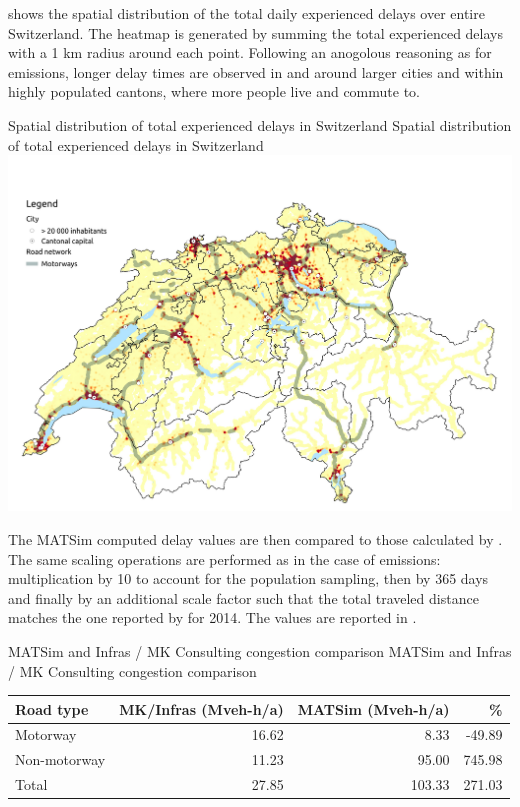  shows the spatial distribution of the total daily experienced delays over entire Switzerland.
The heatmap is generated by summing the total experienced delays with a 1 km radius around each point.
Following an anogolous reasoning as for emissions, longer delay times are observed in and around larger cities and within highly populated cantons, where more people live and commute to.

\createfigure%
{Spatial distribution of total experienced delays in Switzerland}%
{Spatial distribution of total experienced delays in Switzerland}%
{\label{fig:spatialDelays}}%
{\includegraphics[width=1.0\textwidth, angle=0]{figures/total_delays_heatmap.pdf}}%
{}

The MATSim computed delay values are then compared to those calculated by \citet{mkinfras2016staukosten}.
The same scaling operations are performed as in the case of emissions: multiplication by 10 to account for the population sampling, then by 365 days and finally by an additional scale factor such that the total traveled distance matches the one reported by \citet{mkinfras2016staukosten} for 2014.
The values are reported in .


\createtable%
{MATSim and Infras / MK Consulting congestion comparison}%
{MATSim and Infras / MK Consulting congestion comparison}%
{\label{tab:delayValueComparison}}%
{%
  \begin{tabular}[c]{lrrr}
    \toprule
    Road type & MK/Infras (Mveh-h/a) & MATSim (Mveh-h/a) & \%  \\ 
    \midrule
    Motorway      & 16.62 &    8.33 &  -49.89 \\
    Non-motorway  & 11.23 &   95.00 &  745.98 \\
    Total &         27.85 &  103.33 &  271.03 \\
    \bottomrule
  \end{tabular}
}%
{}

